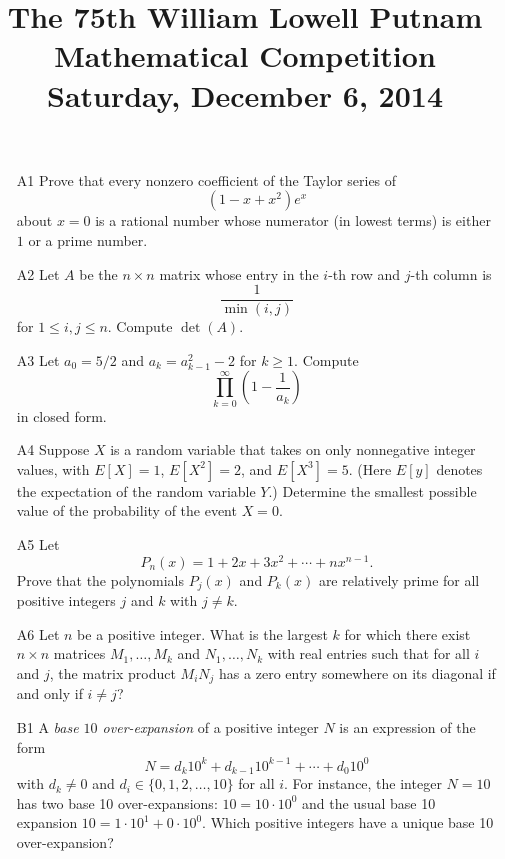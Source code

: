\documentclass[amssymb,twocolumn,pra,10pt,aps]{revtex4-1}
\begin{document}
\title{The 75th William Lowell Putnam Mathematical Competition \\
    Saturday, December 6, 2014}
\maketitle

\begin{itemize}

\item[A1] 
Prove that every nonzero coefficient of the Taylor series of
\[
(1 - x + x^2)e^x
\]
about $x=0$ is a rational number whose numerator (in lowest terms) is either $1$ or a prime number.

\item[A2]
Let $A$ be the $n \times n$ matrix whose entry in the $i$-th row and $j$-th column is
\[
\frac{1}{\min(i,j)}
\]
for $1 \leq i,j \leq n$. Compute $\det(A)$.

\item[A3]
Let $a_0 = 5/2$ and $a_k = a_{k-1}^2 - 2$ for $k \geq 1$. Compute
\[
\prod_{k=0}^\infty \left(1 - \frac{1}{a_k} \right)
\]
in closed form.

\item[A4]
Suppose $X$ is a random variable that takes on only nonnegative integer values,
with $E\left[ X \right] = 1$, $E\left[ X^2 \right] = 2$, and $E \left[ X^3 \right] = 5$.
(Here $E\left[ y \right]$ denotes the expectation of the random variable $Y$.)
Determine the smallest possible value of the probability of the event $X=0$.

\item[A5]
Let
\[
P_n(x) = 1 + 2 x  + 3 x^2 + \cdots + n x^{n-1}.
\]
Prove that the polynomials $P_j(x)$
and $P_k(x)$ are relatively prime
for all positive integers $j$ and $k$ with $j \neq k$.

\item[A6]
Let $n$ be a positive integer. What is the largest $k$ for which there exist $n \times n$ matrices $M_1, \dots, M_k$ and $N_1, \dots, N_k$ with real entries such that for all $i$ and $j$, the matrix product $M_i N_j$ has a zero entry somewhere on its diagonal if and only if $i \neq j$?

\item[B1]
A \emph{base $10$ over-expansion} of a positive integer $N$ is an expression of the form
\[
N = d_k 10^k + d_{k-1} 10^{k-1} + \cdots + d_0 10^0
\]
with $d_k \neq 0$ and $d_i \in \{0,1,2,\dots,10\}$ for all $i$.
For instance, the integer $N = 10$ has two base 10 over-expansions: $10 = 10 \cdot 10^0$
and the usual base 10 expansion $10 = 1 \cdot 10^1 + 0 \cdot 10^0$.
Which positive integers have a unique base 10 over-expansion?


\end{itemize}
\end{document}
